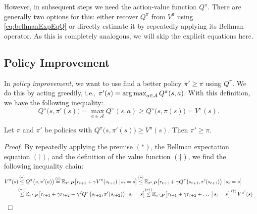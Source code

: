 			However, in subsequent steps we need the action-value function \(Q^\pi\). There are generally two options for this: either recover \(Q^\pi\) from \(V^\pi\) using \eqref{eq:bellmanExpEqQ} or directly estimate it by repeatedly applying its Bellman operator. As this is completely analogous, we will skip the explicit equations here.

		\subsection{Policy Improvement}
			In \emph{policy improvement,} we want to use find a better policy \(\pi' \geq \pi\) using \(Q^\pi\). We do this by acting greedily, i.e., \( \pi'(s) = \operatorname*{arg\,max}_{a \in \mathcal{A}} Q^\pi(s, a) \). With this definition, we have the following inequality:
			\begin{equation}
				Q^\pi\bigl( s, \pi'(s) \bigr)
				= \max_{a \in \mathcal{A}} Q^\pi(s, a)
				\geq Q^\pi\bigl( s, \pi(s) \bigr)
				= V^\pi(s).
			\end{equation}
			\begin{theorem}  \label{th:policyImprovement}
				Let \(\pi\) and \(\pi'\) be policies with \( Q^\pi\bigl( s, \pi'(s) \bigr) \geq V^\pi(s) \). Then \( \pi' \geq \pi \).
			\end{theorem}
			\begin{proof}
				By repeatedly applying the premise \((\ast)\), the Bellman expectation equation \((\dagger)\), and the definition of the value function \((\ddagger)\), we find the following inequality chain:
				\begin{align}
					V^\pi(s)
					 & \overset{\mathclap{(\ast)}}{\leq} Q^\pi\bigl( s, \pi'(a) \bigr)
					\overset{\mathclap{(\dagger)}}{=} \E_{\pi', \mat{P}}\bigl[ r_{t + 1} + \gamma V^\pi(s_{t + 1}) \biggiven s_t = s \bigr]
					\overset{\mathclap{(\ast)}}{\leq} \E_{\pi', \mat{P}}\bigl[ r_{t + 1} + \gamma Q^\pi\bigl( s_{t + 1}, \pi'(s_{t + 1}) \bigr) \biggiven s_t = s \bigr]                                \\
					 & \overset{\mathclap{(\ast\dagger)}}{\leq} \E_{\pi', \mat{P}}\bigl[ r_{t + 1} + \gamma r_{t + 2} + \gamma^2 Q^\pi\bigl( s_{t + 2}, \pi'(s_{t + 2}) \bigr) \biggiven s_t = s \bigr]
					\overset{\mathclap{(\ast\dagger)}}{\leq} \E_{\pi', \mat{P}}\bigl[ r_{t + 1} + \gamma r_{t + 2} + \dots \biggiven s_t = s \bigr]
					\overset{\mathclap{(\ddagger)}}{=} V^{\pi'}(s)
				\end{align}
			\end{proof}

